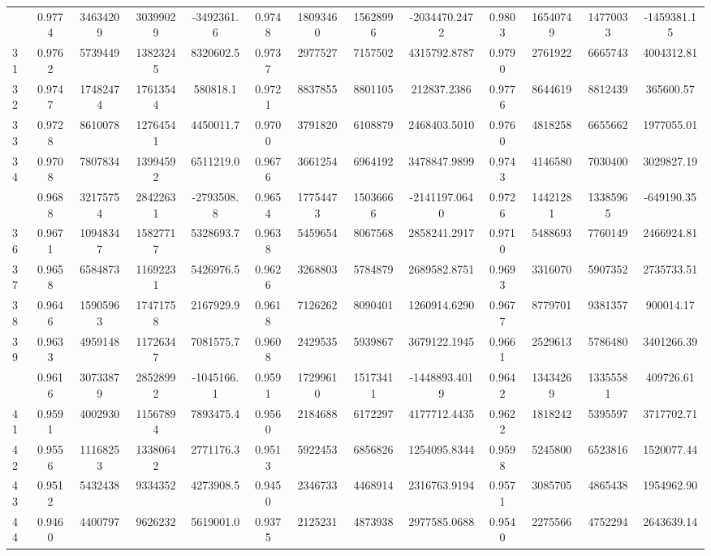 \documentclass[
  12pt,
]{article}
\begin{document}
\begin{longtable}[t]{lcccccccccccc}
\addlinespace
30 & 0.9774 & 34634209 & 30399029 & -3492361.6 & 0.9748 & 18093460 & 15628996 & -2034470.2472 & 0.9803 & 16540749 & 14770033 & -1459381.15\\
31 & 0.9762 & 5739449 & 13823245 & 8320602.5 & 0.9737 & 2977527 & 7157502 & 4315792.8787 & 0.9790 & 2761922 & 6665743 & 4004312.81\\
32 & 0.9747 & 17482474 & 17613544 & 580818.1 & 0.9721 & 8837855 & 8801105 & 212837.2386 & 0.9776 & 8644619 & 8812439 & 365600.57\\
33 & 0.9728 & 8610078 & 12764541 & 4450011.7 & 0.9700 & 3791820 & 6108879 & 2468403.5010 & 0.9760 & 4818258 & 6655662 & 1977055.01\\
34 & 0.9708 & 7807834 & 13994592 & 6511219.0 & 0.9676 & 3661254 & 6964192 & 3478847.9899 & 0.9743 & 4146580 & 7030400 & 3029827.19\\
\addlinespace
35 & 0.9688 & 32175754 & 28422631 & -2793508.8 & 0.9654 & 17754473 & 15036666 & -2141197.0640 & 0.9726 & 14421281 & 13385965 & -649190.35\\
36 & 0.9671 & 10948347 & 15827717 & 5328693.7 & 0.9638 & 5459654 & 8067568 & 2858241.2917 & 0.9710 & 5488693 & 7760149 & 2466924.81\\
37 & 0.9658 & 6584873 & 11692231 & 5426976.5 & 0.9626 & 3268803 & 5784879 & 2689582.8751 & 0.9693 & 3316070 & 5907352 & 2735733.51\\
38 & 0.9646 & 15905963 & 17471758 & 2167929.9 & 0.9618 & 7126262 & 8090401 & 1260914.6290 & 0.9677 & 8779701 & 9381357 & 900014.17\\
39 & 0.9633 & 4959148 & 11726347 & 7081575.7 & 0.9608 & 2429535 & 5939867 & 3679122.1945 & 0.9661 & 2529613 & 5786480 & 3401266.39\\
\addlinespace
40 & 0.9616 & 30733879 & 28528992 & -1045166.1 & 0.9591 & 17299610 & 15173411 & -1448893.4019 & 0.9642 & 13434269 & 13355581 & 409726.61\\
41 & 0.9591 & 4002930 & 11567894 & 7893475.4 & 0.9560 & 2184688 & 6172297 & 4177712.4435 & 0.9622 & 1818242 & 5395597 & 3717702.71\\
42 & 0.9556 & 11168253 & 13380642 & 2771176.3 & 0.9513 & 5922453 & 6856826 & 1254095.8344 & 0.9598 & 5245800 & 6523816 & 1520077.44\\
43 & 0.9512 & 5432438 & 9334352 & 4273908.5 & 0.9450 & 2346733 & 4468914 & 2316763.9194 & 0.9571 & 3085705 & 4865438 & 1954962.90\\
44 & 0.9460 & 4400797 & 9626232 & 5619001.0 & 0.9375 & 2125231 & 4873938 & 2977585.0688 & 0.9540 & 2275566 & 4752294 & 2643639.14\\

\end{longtable}
\end{document}
